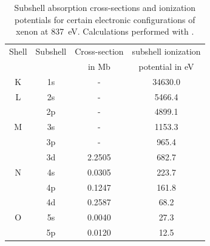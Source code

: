 %
\begin{table}
	\centering
		\begin{tabular}{ | c | c | c | c | }
			\hline
			Shell & Subshell & Cross-section & subshell ionization \\
				&	& in Mb & potential in eV \\ \hline
			K & 1s & - & 34630.0 \\ \hline
			L & 2s & - & 5466.4  \\ 
			\ & 2p & - & 4899.1 \\ \hline
			M & 3s & - & 1153.3  \\ 
			\ & 3p & - & 965.4 \\ 
			\ & 3d & 2.2505 & 682.7 \\ \hline
			N & 4s & 0.0305 & 223.7 \\ 
			\ & 4p & 0.1247 & 161.8 \\ 
			\ & 4d & 0.2587 & 68.2  \\ \hline
			O & 5s & 0.0040 & 27.3  \\ 
			\ & 5p & 0.0120 & 12.5  \\ \hline
		\end{tabular}
	\caption[Subshell absorption cross-sections and ionization potentials for xenon.]{Subshell absorption cross-sections and ionization potentials for certain electronic configurations of xenon at \SI{837}{\electronvolt}. Calculations performed with \citep{los-alamos-2016,Cowan-1981-Cal}.}
	\label{tab:xenon-photoionization-cross-section}
\end{table}
